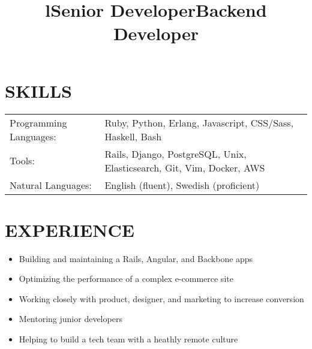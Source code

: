 \documentclass[line]{res}
\title{l}\dates{r}\\
\begin{document}
\begin{resume}

\section{SKILLS}
\begin{tabular}{ l l }
Programming Languages: &
Ruby,
Python,
Erlang,
Javascript,
CSS/Sass,
Haskell,
Bash\\

Tools: &
Rails,
Django,
PostgreSQL,
Unix,
Elasticsearch,
Git,
Vim,
Docker,
AWS\\

Natural Languages: &
English (fluent),
Swedish (proficient)
\end{tabular}

\section {EXPERIENCE}
\vspace {2 pt}

\title{Senior Developer}
\begin{position}
\noindent
\vspace {-10 pt}
\begin{itemize}

\item Building and maintaining a Rails, Angular, and Backbone apps
\item Optimizing the performance of a complex e-commerce site
\item Working closely with product, designer, and marketing to increase conversion
\item Mentoring junior developers
\item Helping to build a tech team with a heathly remote culture

\end{itemize}
\end{position}

\title{Backend Developer}
\begin{position}
\noindent
\vspace {-10 pt}
\begin{itemize}


\end{itemize}
\end{position}
\end{resume}
\end{document}
